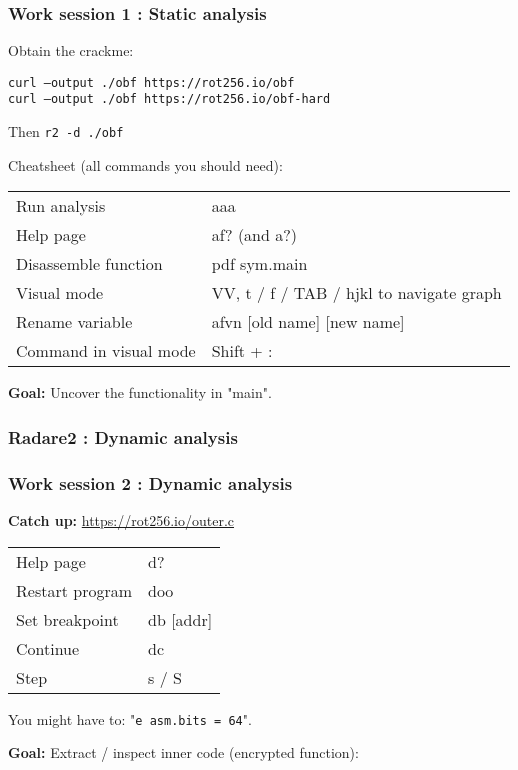 \documentclass{beamer}
\begin{document}
\begin{frame}
\frametitle{Work session 1 : Static analysis}
Obtain the crackme: \\

\vspace{3mm}

\texttt{curl --output ./obf https://rot256.io/obf} \\
\texttt{curl --output ./obf https://rot256.io/obf-hard}

\vspace{3mm}

Then \texttt{r2 -d ./obf}

\vspace{3mm}

Cheatsheet (all commands you should need):

\vspace{3mm}

\begin{tabular}{l | l}
    Run analysis         & aaa \\
    Help page            & af? (and a?) \\
    Disassemble function & pdf sym.main \\
    Visual mode          & VV, t / f / TAB / hjkl to navigate graph \\
    Rename variable      & afvn [old name] [new name] \\
    Command in visual mode & Shift + :
\end{tabular}

\vspace{3mm}

\textbf{Goal:} Uncover the functionality in "main".

\end{frame}

\begin{frame}
\frametitle{Radare2 : Dynamic analysis}
\end{frame}

\begin{frame}
\frametitle{Work session 2 : Dynamic analysis}

\textbf{Catch up:} \url{https://rot256.io/outer.c}

\vspace{3mm}

\begin{tabular}{l | l}
    Help page        & d? \\
    Restart program  & doo \\
    Set breakpoint   & db [addr] \\
    Continue         & dc \\
    Step             & s / S \\
\end{tabular}

\vspace{3mm}

You might have to: "\texttt{e asm.bits = 64}". \\

\vspace{3mm}

\textbf{Goal:} Extract / inspect inner code (encrypted function):
\end{frame}
\end{document}
